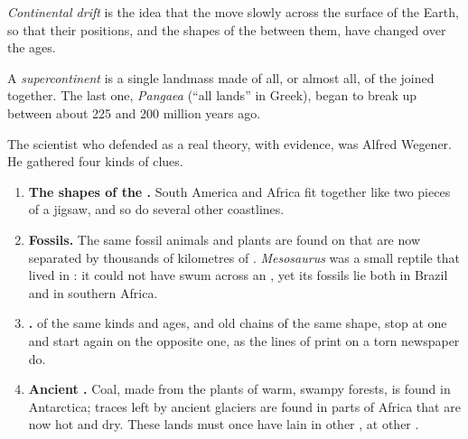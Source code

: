 \begin{definition}\label{def:g7:plate-tectonics:continental-drift}
\emph{Continental drift} is the idea that the
 move slowly across the surface of the Earth, so that their
positions, and the shapes of the  between them, have changed over
the ages.
\end{definition}

\begin{definition}[Supercontinent]\label{def:g7:plate-tectonics:supercontinent}
A \emph{supercontinent} is a single landmass made of
all, or almost all, of the  joined together. The last one,
\emph{Pangaea} (``all lands'' in Greek), began to break up
between about 225 and 200 million years ago.
\end{definition}

The scientist who defended  as a real theory, with
evidence, was Alfred Wegener. He gathered four kinds of clues.

\begin{enumerate}
  \item \textbf{The shapes of the .} South America and Africa fit
        together like two pieces of a jigsaw, and so do several other
        coastlines.
  \item \textbf{Fossils.} The same fossil animals and plants are found on
         that are now separated by thousands of kilometres of
        . \emph{Mesosaurus} was a small reptile that lived in : it could not have swum across an , yet its fossils lie
        both in Brazil and in southern Africa.
  \item \textbf{.}  of the same kinds and ages, and old 
        chains of the same shape, stop at one  and start again on the
        opposite one, as the lines of print on a torn newspaper do.
  \item \textbf{Ancient .} Coal, made from the plants of warm,
        swampy forests, is found in Antarctica; traces left by ancient
        glaciers are found in parts of Africa that are now hot and dry.
        These lands must once have lain in other , at other
        .
\end{enumerate}

